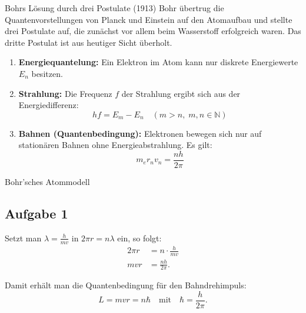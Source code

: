 \documentclass[11pt,a4paper,oneside]{article}
\begin{document}
	\begin{theo}{Bohrs Lösung durch drei Postulate (1913)}
		Bohr übertrug die Quantenvorstellungen von Planck und Einstein 
		auf den Atomaufbau und stellte drei Postulate auf, 
		die zunächst vor allem beim Wasserstoff erfolgreich waren. 
		Das dritte Postulat ist aus heutiger Sicht überholt.
		
		\begin{enumerate}
			\item \textbf{Energiequantelung:} 
			Ein Elektron im Atom kann nur diskrete Energiewerte $E_n$ besitzen.
			
			\item \textbf{Strahlung:} 
			Die Frequenz $f$ der Strahlung ergibt sich aus der Energiedifferenz:
			\[
			h f = E_m - E_n \quad (m > n, \; m,n \in \mathbb{N})
			\]
			
			\item \textbf{Bahnen (Quantenbedingung):} 
			Elektronen bewegen sich nur auf stationären Bahnen ohne Energieabstrahlung. 
			Es gilt:
			\[
			m_e r_n v_n = \frac{n h}{2 \pi}
			\]
		\end{enumerate}
	\end{theo}
	
	\begin{loesung}{Bohr'sches Atommodell}
		\subsection*{Aufgabe 1}		
		Setzt man $\lambda = \tfrac{h}{mv}$ in $2 \pi r = n \lambda$ ein, so folgt:
		\begin{align*}
			2 \pi r &= n \cdot \frac{h}{m v} \\
			m v r &= \frac{n h}{2 \pi}.
		\end{align*}
		
		Damit erhält man die Quantenbedingung für den Bahndrehimpuls:
		\[
		L = m v r = n \hbar \quad \text{mit} \quad \hbar = \frac{h}{2 \pi}.
		\]
	\end{loesung}
	
	
	
\end{document}
